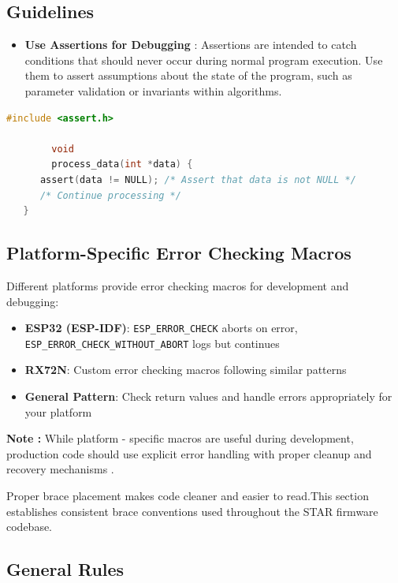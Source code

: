 \subsection{Guidelines
   }
    \begin{itemize}
    \item \textbf{Use Assertions for Debugging
   }: Assertions are intended to catch conditions that should never occur during normal program execution. Use them to assert assumptions about the state of the program, such as parameter validation or invariants within algorithms.
\end{itemize}
    \begin{lstlisting}[language = C]
#include <assert.h>

        void
        process_data(int *data) {
      assert(data != NULL); /* Assert that data is not NULL */
      /* Continue processing */
   }
    \end{lstlisting}

\subsection{Platform-Specific Error Checking Macros}
Different platforms provide error checking macros for development and debugging:

\begin{itemize}
    \item \textbf{ESP32 (ESP-IDF)}: \texttt{ESP\_ERROR\_CHECK} aborts on error, \texttt{ESP\_ERROR\_CHECK\_WITHOUT\_ABORT} logs but continues
    \item \textbf{RX72N}: Custom error checking macros following similar patterns
    \item \textbf{General Pattern}: Check return values and handle errors appropriately for your platform
\end{itemize}

    \textbf{Note :} While platform -
        specific macros are useful during development,
        production code should use explicit error handling with
            proper cleanup and recovery mechanisms
                .

        Proper brace placement makes code cleaner and easier to
            read.This section establishes consistent brace conventions used
                throughout the STAR firmware codebase.

\subsection{General Rules
   }

